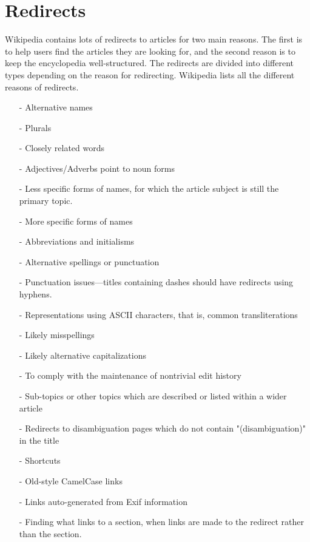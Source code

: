 \section{Redirects}
Wikipedia contains lots of redirects to articles for two main reasons. The first is to help users find the articles they are looking for, and the second reason is to keep the encyclopedia well-structured. The redirects are divided into different types depending on the reason for redirecting. Wikipedia lists all the different reasons of redirects. \cite{wiki:redirect} 
\begin{itemize}[noitemsep]
\item[-] Alternative names 
\item[-] Plurals 
\item[-] Closely related words 
\item[-] Adjectives/Adverbs point to noun forms 
\item[-] Less specific forms of names, for which the article subject is still the primary topic. 
\item[-] More specific forms of names 
\item[-] Abbreviations and initialisms 
\item[-] Alternative spellings or punctuation
\item[-] Punctuation issues—titles containing dashes should have redirects using hyphens.
\item[-] Representations using ASCII characters, that is, common transliterations 
\item[-] Likely misspellings
\item[-] Likely alternative capitalizations 
\item[-] To comply with the maintenance of nontrivial edit history
\item[-] Sub-topics or other topics which are described or listed within a wider article
\item[-] Redirects to disambiguation pages which do not contain "(disambiguation)" in the title
\item[-] Shortcuts
\item[-] Old-style CamelCase links 
\item[-] Links auto-generated from Exif information 
\item[-] Finding what links to a section, when links are made to the redirect rather than the section.
\end{itemize}

